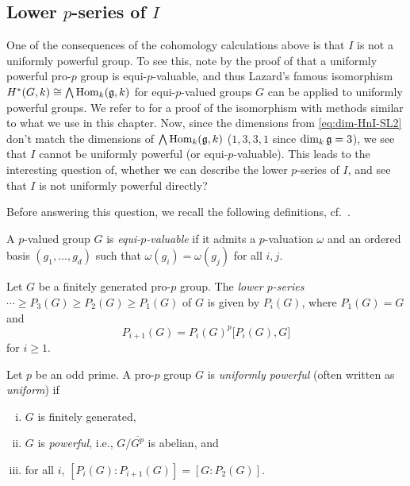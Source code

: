 \subsection{Lower \texorpdfstring{$p$}{p}-series of \texorpdfstring{$I$}{I}}%
\label{subsec:lower-p-series-SL2}

One of the consequences of the cohomology calculations above is that $I$ is not a uniformly powerful group. To see this, note by the proof of \cite[Thm.~3.3.3]{Laz-complements} that a uniformly powerful pro-$p$ group is equi-$p$-valuable, and thus Lazard's famous isomorphism $H^{*}(G,k) \cong \bigwedge \operatorname{Hom}_{k}(\mathfrak{g},k)$ for equi-$p$-valued groups $G$ can be applied to uniformly powerful groups. We refer to \cite[Cor.~6.3]{Sor} for a proof of the isomorphism with methods similar to what we use in this chapter. Now, since the dimensions from \eqref{eq:dim-HnI-SL2} don't match the dimensions of $\bigwedge \operatorname{Hom}_{k}(\mathfrak{g},k)$ ($1,3,3,1$ since $\dim_{k} \mathfrak{g} = 3$), we see that $I$ cannot be uniformly powerful (or equi-$p$-valuable). This leads to the interesting question of, whether we can describe the lower $p$-series of $I$, and see that $I$ is not uniformly powerful directly?

Before answering this question, we recall the following definitions, cf.\ \cite[Def.~1.15, Cor.~1.20, Def.~3.1 and Def.~4.1]{analytic_pro-p_groups}.
\begin{definition}
  A $p$-valued group $G$ is \emph{equi-$p$-valuable} if it admits a $p$-valuation $\omega$ and an ordered basis $(g_{1},\dotsc,g_{d})$ such that $\omega(g_{i}) = \omega(g_{j})$ for all $i,j$.
\end{definition}

\begin{definition}
  Let $G$ be a finitely generated pro-$p$ group. The \emph{lower $p$-series} $\dotsb \geq P_{3}(G) \geq P_{2}(G) \geq P_{1}(G)$ of $G$ is given by $P_{i}(G)$, where $P_{1}(G) = G$ and
  \begin{equation*}
    P_{i+1}(G) = P_{i}(G)^{p}\bigl[ P_{i}(G),G \bigr]
  \end{equation*}
  for $i \geq 1$.
\end{definition}

\begin{definition}
  Let $p$ be an odd prime. A pro-$p$ group $G$ is \emph{uniformly powerful} (often written as \emph{uniform}) if
  \begin{enumerate}[(i)]
    \item $G$ is finitely generated,
    \item $G$ is \emph{powerful}, i.e., $G/\overline{G^{p}}$ is abelian, and
    \item for all $i$, $[P_{i}(G) : P_{i+1}(G)] = [G : P_{2}(G)]$.
  \end{enumerate}
\end{definition}

